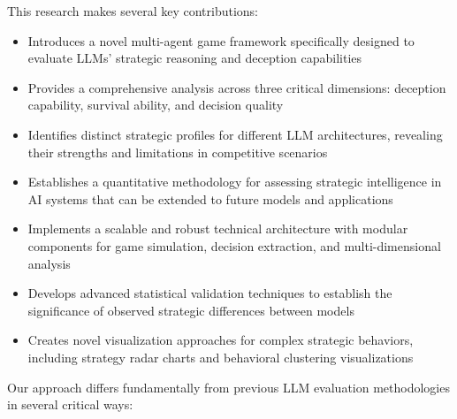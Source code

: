 \documentclass{article}
\begin{document}
This research makes several key contributions:
\begin{itemize}
    \item Introduces a novel multi-agent game framework specifically designed to evaluate LLMs' strategic reasoning and deception capabilities
    \item Provides a comprehensive analysis across three critical dimensions: deception capability, survival ability, and decision quality
    \item Identifies distinct strategic profiles for different LLM architectures, revealing their strengths and limitations in competitive scenarios
    \item Establishes a quantitative methodology for assessing strategic intelligence in AI systems that can be extended to future models and applications
    \item Implements a scalable and robust technical architecture with modular components for game simulation, decision extraction, and multi-dimensional analysis
    \item Develops advanced statistical validation techniques to establish the significance of observed strategic differences between models
    \item Creates novel visualization approaches for complex strategic behaviors, including strategy radar charts and behavioral clustering visualizations
\end{itemize}

Our approach differs fundamentally from previous LLM evaluation methodologies in several critical ways:
\end{document}
